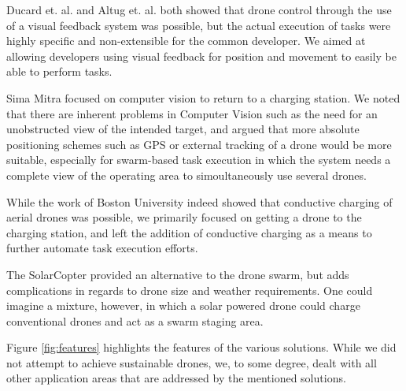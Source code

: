 Ducard et. al. and Altug et. al. both showed that drone control through the use of a visual feedback system was possible, but the actual execution of tasks were highly specific and non-extensible for the common developer. We aimed at allowing developers using visual feedback for position and movement to easily be able to perform tasks.

Sima Mitra focused on computer vision to return to a charging station. We noted that there are inherent problems in Computer Vision such as the need for an unobstructed view of the intended target, and argued that more absolute positioning schemes such as GPS or external tracking of a drone would be more suitable, especially for swarm-based task execution in which the system needs a complete view of the operating area to simoultaneously use several drones.

While the work of Boston University indeed showed that conductive charging of aerial drones was possible, we primarily focused on getting a drone to the charging station, and left the addition of conductive charging as a means to further automate task execution efforts.

The SolarCopter provided an alternative to the drone swarm, but adds complications in regards to drone size and weather requirements. One could imagine a mixture, however, in which a solar powered drone could charge conventional drones and act as a swarm staging area.

Figure \ref{fig:features} highlights the features of the various solutions. While we did not attempt to achieve sustainable drones, we, to some degree, dealt with all other application areas that are addressed by the mentioned solutions.

